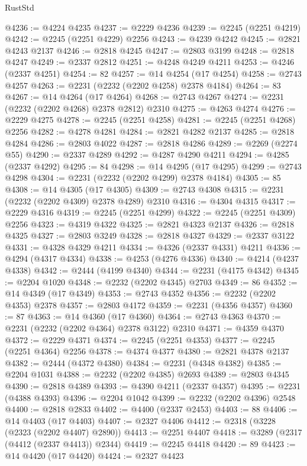 \begin{lexlean}{RustStd}
\begin{coremodule}
@4236 := @4224 @4235
@4237 := @2229 @4236
@4239 := @2245 (@2251 @4219)
@4242 := @2245 (@2251 @4229) @2256
@4243 := @4239 @4242
@4245 := @2821 @4243 @2137
@4246 := @2818 @4245
@4247 := @2803 @3199
@4248 := @2818 @4247
@4249 := @2337 @2812
@4251 := @4248 @4249 @4211
@4253 := @4246 (@2337 @4251)
@4254 := 82
@4257 := @14 @4254 (@17 @4254)
@4258 := @2743 @4257
@4263 := @2231 (@2232 (@2202 @4258) @2378 @4184)
@4264 := 83
@4267 := @14 @4264 (@17 @4264)
@4268 := @2743 @4267
@4274 := @2231 (@2232 (@2202 @4268) @2378 @2812) @2310
@4275 := @4263 @4274
@4276 := @2229 @4275
@4278 := @2245 (@2251 @4258)
@4281 := @2245 (@2251 @4268) @2256
@4282 := @4278 @4281
@4284 := @2821 @4282 @2137
@4285 := @2818 @4284
@4286 := @2803 @4022
@4287 := @2818 @4286
@4289 := @2269 (@2274 @55)
@4290 := @2337 @4289
@4292 := @4287 @4290 @4211
@4294 := @4285 (@2337 @4292)
@4295 := 84
@4298 := @14 @4295 (@17 @4295)
@4299 := @2743 @4298
@4304 := @2231 (@2232 (@2202 @4299) @2378 @4184)
@4305 := 85
@4308 := @14 @4305 (@17 @4305)
@4309 := @2743 @4308
@4315 := @2231 (@2232 (@2202 @4309) @2378 @4289) @2310
@4316 := @4304 @4315
@4317 := @2229 @4316
@4319 := @2245 (@2251 @4299)
@4322 := @2245 (@2251 @4309) @2256
@4323 := @4319 @4322
@4325 := @2821 @4323 @2137
@4326 := @2818 @4325
@4327 := @2803 @3249
@4328 := @2818 @4327
@4329 := @2337 @3122
@4331 := @4328 @4329 @4211
@4334 := @4326 (@2337 @4331) @4211
@4336 := @4294 (@4317 @4334)
@4338 := @4253 (@4276 @4336)
@4340 := @4214 (@4237 @4338)
@4342 := @2444 (@4199 @4340)
@4344 := @2231 (@4175 @4342)
@4345 := @2204 @1020
@4348 := @2232 (@2202 @4345) @2703
@4349 := 86
@4352 := @14 @4349 (@17 @4349)
@4353 := @2743 @4352
@4356 := @2232 (@2202 @4353) @2378
@4357 := @2803 @4172
@4359 := @2231 (@4356 @4357)
@4360 := 87
@4363 := @14 @4360 (@17 @4360)
@4364 := @2743 @4363
@4370 := @2231 (@2232 (@2202 @4364) @2378 @3122) @2310
@4371 := @4359 @4370
@4372 := @2229 @4371
@4374 := @2245 (@2251 @4353)
@4377 := @2245 (@2251 @4364) @2256
@4378 := @4374 @4377
@4380 := @2821 @4378 @2137
@4382 := @2444 (@4372 @4380)
@4384 := @2231 (@4348 @4382)
@4385 := @2204 @1031
@4388 := @2232 (@2202 @4385) @2693
@4389 := @2803 @4345
@4390 := @2818 @4389
@4393 := @4390 @4211 (@2337 @4357)
@4395 := @2231 (@4388 @4393)
@4396 := @2204 @1042
@4399 := @2232 (@2202 @4396) @2548
@4400 := @2818 @2833
@4402 := @4400 (@2337 @2453)
@4403 := 88
@4406 := @14 @4403 (@17 @4403)
@4407 := @2327 @4406
@4412 := @2318 (@3228 (@2323 (@2202 @4407) @2890))
@4413 := @2251 @4407
@4418 := @3289 (@2317 (@4412 (@2337 @4413)) @2344)
@4419 := @2245 @4418
@4420 := 89
@4423 := @14 @4420 (@17 @4420)
@4424 := @2327 @4423

\end{coremodule}
\end{lexlean}
